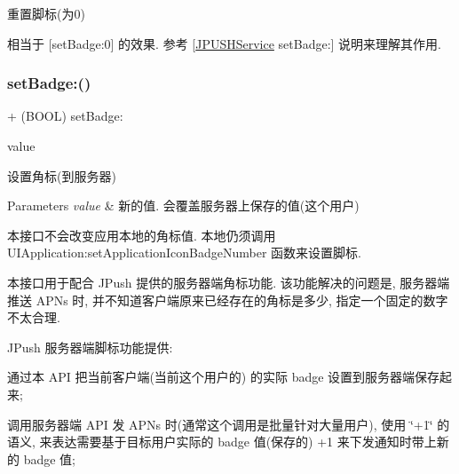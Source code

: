 重置脚标(为0)

相当于 \mbox{[}set\+Badge\+:0\mbox{]} 的效果. 参考 \mbox{[}\mbox{\hyperlink{interface_j_p_u_s_h_service}{J\+P\+U\+S\+H\+Service}} set\+Badge\+:\mbox{]} 说明来理解其作用. \mbox{\label{interface_j_p_u_s_h_service_a3d77239b5fc4483e4dd6bfbf312d98d3}} 
\subsubsection{\texorpdfstring{set\+Badge\+:()}{setBadge:()}}
{\footnotesize\ttfamily + (B\+O\+OL) set\+Badge\+: \begin{DoxyParamCaption}\item[{(N\+S\+Integer)}]{value }\end{DoxyParamCaption}}

设置角标(到服务器)


\begin{DoxyParams}{Parameters}
{\em value} & 新的值. 会覆盖服务器上保存的值(这个用户)\\
\hline
\end{DoxyParams}
本接口不会改变应用本地的角标值. 本地仍须调用 U\+I\+Application\+:set\+Application\+Icon\+Badge\+Number 函数来设置脚标.

本接口用于配合 J\+Push 提供的服务器端角标功能. 该功能解决的问题是, 服务器端推送 A\+P\+Ns 时, 并不知道客户端原来已经存在的角标是多少, 指定一个固定的数字不太合理.

J\+Push 服务器端脚标功能提供\+:


\begin{DoxyItemize}
\item 通过本 A\+PI 把当前客户端(当前这个用户的) 的实际 badge 设置到服务器端保存起来;
\item 调用服务器端 A\+PI 发 A\+P\+Ns 时(通常这个调用是批量针对大量用户), 使用 \char`\"{}+1\char`\"{} 的语义, 来表达需要基于目标用户实际的 badge 值(保存的) +1 来下发通知时带上新的 badge 值; 
\end{DoxyItemize}\mbox{\label{interface_j_p_u_s_h_service_a7bf32721e896ecd7070c85cdd709a957}} 
